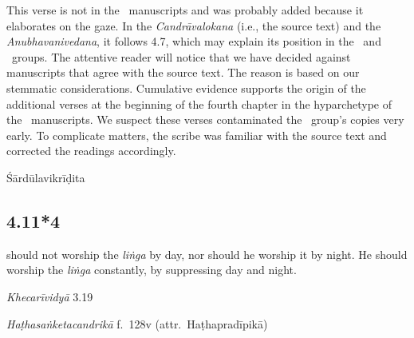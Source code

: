 \begin{ekdosis}
\begin{testimonia}[hp04_011_3]
\end{testimonia}

\begin{philcomm}[hp04_011_3]
This verse is not in the \textalpha\ manuscripts and was probably added because it elaborates on the gaze. In the \emph{Candrāvalokana} (i.e., the source text) and the \emph{Anubhavanivedana}, it follows 4.7, which may explain its position in the \textgamma\ and \textdelta\ groups. The attentive reader will notice that we have decided against manuscripts that agree with the source text. The reason is based on our stemmatic considerations. Cumulative evidence supports the origin of the additional verses at the beginning of the fourth chapter in the hyparchetype of the \textepsilon\ manuscripts. We suspect these verses contaminated the \textbeta\ group's copies very early. To complicate matters, the scribe was familiar with the source text and corrected the readings accordingly.
\end{philcomm}


\begin{metre}[hp04_011_3]
Śārdūlavikrīḍita 
\end{metre}


\subsection*{4.11*4}
\begin{translation} should not worship the \emph{liṅga} by day, nor should he worship it by night. He should worship the \emph{liṅga} constantly, by suppressing day and night.
\end{translation}

\begin{sources}[hp04_011_4]
\emph{Khecarīvidyā} 3.19
\begin{versinnote}
\end{versinnote}
\end{sources}

\begin{testimonia}[hp04_011_4]
\emph{Haṭhasaṅketacandrikā} f.~128v (attr.~Haṭhapradīpikā)
\begin{versinnote}
\end{versinnote}
\end{testimonia}


\end{ekdosis}
